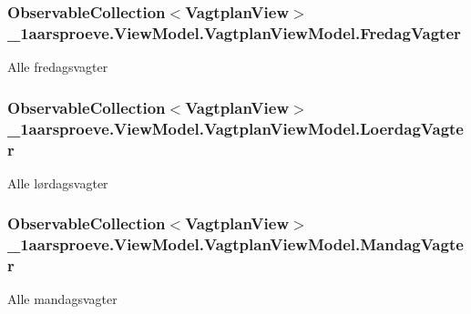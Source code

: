 \subsubsection[{Fredag\+Vagter}]{\setlength{\rightskip}{0pt plus 5cm}Observable\+Collection$<${\bf Vagtplan\+View}$>$ \+\_\+1aarsproeve.\+View\+Model.\+Vagtplan\+View\+Model.\+Fredag\+Vagter}\label{class__1aarsproeve_1_1_view_model_1_1_vagtplan_view_model_a3955ea1d063e57b61586ae4d2a46ea26}


Alle fredagsvagter 

\hypertarget{class__1aarsproeve_1_1_view_model_1_1_vagtplan_view_model_a8610e77bb66663a939068e98f2714df0}{}
\subsubsection[{Loerdag\+Vagter}]{\setlength{\rightskip}{0pt plus 5cm}Observable\+Collection$<${\bf Vagtplan\+View}$>$ \+\_\+1aarsproeve.\+View\+Model.\+Vagtplan\+View\+Model.\+Loerdag\+Vagter}\label{class__1aarsproeve_1_1_view_model_1_1_vagtplan_view_model_a8610e77bb66663a939068e98f2714df0}


Alle lørdagsvagter 

\hypertarget{class__1aarsproeve_1_1_view_model_1_1_vagtplan_view_model_aab4a9280616fcd59a1d012cb12bd8195}{}
\subsubsection[{Mandag\+Vagter}]{\setlength{\rightskip}{0pt plus 5cm}Observable\+Collection$<${\bf Vagtplan\+View}$>$ \+\_\+1aarsproeve.\+View\+Model.\+Vagtplan\+View\+Model.\+Mandag\+Vagter}\label{class__1aarsproeve_1_1_view_model_1_1_vagtplan_view_model_aab4a9280616fcd59a1d012cb12bd8195}


Alle mandagsvagter 

\hypertarget{class__1aarsproeve_1_1_view_model_1_1_vagtplan_view_model_a4ea415eb2f1e6f7e82e4018e276d1197}{}
